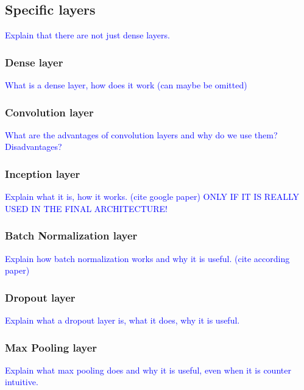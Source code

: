 \subsection{Specific layers}
\textcolor{blue}{Explain that there are not just dense layers.}
\subsubsection{Dense layer}
\textcolor{blue}{What is a dense layer, how does it work (can maybe be omitted)}
\subsubsection{Convolution layer}
\textcolor{blue}{What are the advantages of convolution layers and why do we use them? Disadvantages?}
\subsubsection{Inception layer}
\textcolor{blue}{Explain what it is, how it works. (cite google paper) ONLY IF IT IS REALLY USED IN THE FINAL ARCHITECTURE!}
\subsubsection{Batch Normalization layer}
\textcolor{blue}{Explain how batch normalization works and why it is useful. (cite according paper)}
\subsubsection{Dropout layer}
\textcolor{blue}{Explain what a dropout layer is, what it does, why it is useful.}
\subsubsection{Max Pooling layer}
\textcolor{blue}{Explain what max pooling does and why it is useful, even when it is counter intuitive.}